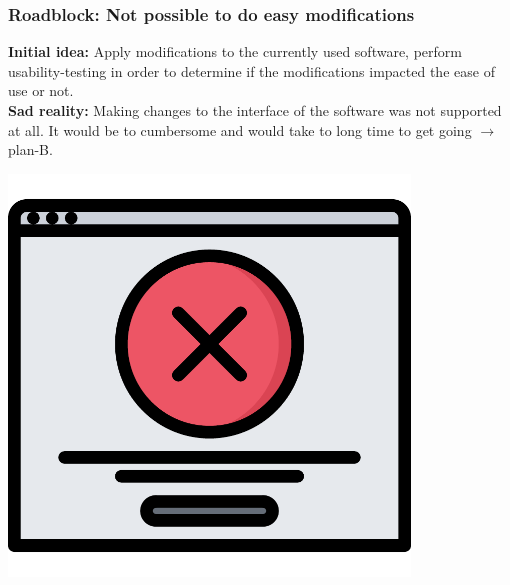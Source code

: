 \documentclass[xcolor=svgnames,10pt,aspectratio=1610]{beamer}
\begin{document}
\begin{frame}
  \frametitle{Roadblock: Not possible to do easy modifications}
  \begin{minipage}{.49\textwidth}
    \textbf{Initial idea:}
    Apply modifications to the currently used software, perform
    usability-testing in order to determine if the modifications impacted the
    ease of use or not. \\

    \textbf{Sad reality:}
    Making changes to the interface of the software was not supported at all.
    It would be to cumbersome and would take to long time to get going
    $\to$ plan-B.
  \end{minipage}
  \begin{minipage}{.49\textwidth}
    \hspace{1.5cm}\includegraphics[width=0.8\textwidth]{img/error.pdf}
  \end{minipage}
\end{frame}
\end{document}

